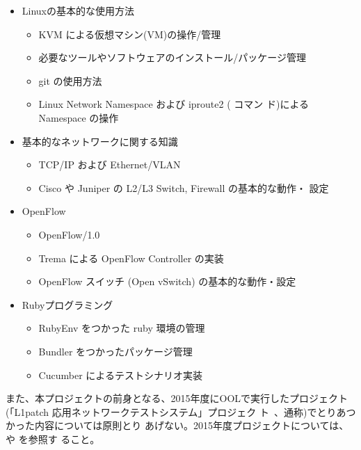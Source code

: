 \begin{itemize}
 \item Linuxの基本的な使用方法
       \begin{itemize}
        \item KVM による仮想マシン(VM)の操作/管理
        \item 必要なツールやソフトウェアのインストール/パッケージ管理
        \item git の使用方法
        \item Linux Network Namespace および iproute2 (  コマン
              ド)によるNamespace の操作
       \end{itemize}
 \item 基本的なネットワークに関する知識
       \begin{itemize}
        \item TCP/IP および Ethernet/VLAN
        \item Cisco や Juniper の L2/L3 Switch, Firewall の基本的な動作・
              設定
       \end{itemize}
 \item OpenFlow
       \begin{itemize}
        \item OpenFlow/1.0
        \item Trema による OpenFlow Controller の実装
        \item OpenFlow スイッチ (Open vSwitch) の基本的な動作・設定
       \end{itemize}
 \item Rubyプログラミング
       \begin{itemize}
        \item RubyEnv をつかった ruby 環境の管理
        \item Bundler をつかったパッケージ管理
        \item Cucumber によるテストシナリオ実装
       \end{itemize}
\end{itemize}

また、本プロジェクトの前身となる、2015年度にOOLで実行したプロジェクト
(「L1patch 応用ネットワークテストシステム」プロジェク
ト~\cite{ool-l1pj-web}、通称\lopj)でとりあつかった内容については原則とり
あげない。2015年度プロジェクトについては、\lopjpoc や \lopjtech を参照す
ること。

